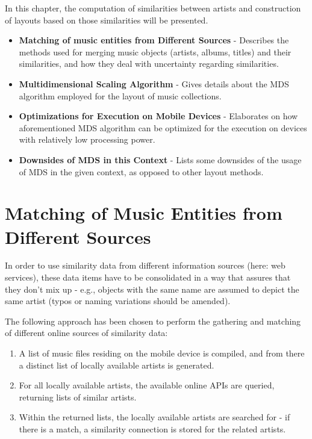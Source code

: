 In this chapter, the computation of similarities between artists and construction of layouts based on those similarities will be presented.

\begin{itemize}
	\item \textbf {Matching of music entities from Different Sources} - Describes the methods used for merging music objects (artists, albums, titles) and their similarities, and how they deal with uncertainty regarding similarities.
	\item \textbf {Multidimensional Scaling Algorithm} - Gives details about the MDS algorithm employed for the layout of music collections.
	\item \textbf {Optimizations for Execution on Mobile Devices} - Elaborates on how aforementioned MDS algorithm can be optimized for the execution on devices with relatively low processing power.
	\item \textbf {Downsides of MDS in this Context} - Lists some downsides of the usage of MDS in the given context, as opposed to other layout methods.
\end{itemize}

\section{Matching of Music Entities from Different Sources}

In order to use similarity data from different information sources (here: web services), these
data items have to be consolidated in a way that assures that they don't mix up - e.g., objects with
the same name are assumed to depict the same artist (typos or naming variations should be amended).

The following approach has been chosen to perform the gathering and matching of different online sources of 
similarity data:

\begin{enumerate}
	\item A list of music files residing on the mobile device is compiled, and from there a distinct list of 
locally available artists is generated.
	\item For all locally available artists, the available online APIs are queried, returning lists of similar artists.
	\item Within the returned lists, the locally available artists are searched for - if there is a match, a
similarity connection is stored for the related artists.
\end{enumerate}

